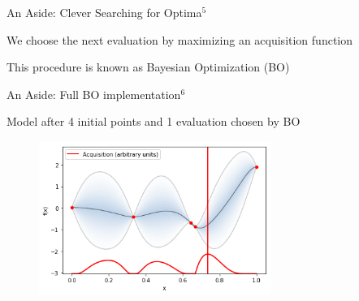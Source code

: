 \documentclass{beamer}
\begin{document}
\begin{frame}{An Aside: Clever Searching for Optima$^5$}
	\begin{block}{}
	We choose the next evaluation by maximizing an acquisition function
	
	\begin{figure}[h]
	\begin{center}
	\end{center}
\end{figure}
	This procedure is known as Bayesian Optimization (BO)
\end{block}
\end{frame}
\begin{frame}{An Aside: Full BO implementation$^6$}
	\begin{block}{}
		Model after 4 initial points and 1 evaluation chosen by BO
			\begin{figure}[h]
			\begin{center}
				\includegraphics[height=5cm]{BO1}
			\end{center}
		\end{figure}
	\end{block}
\end{frame}
\end{document}
